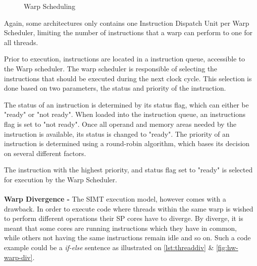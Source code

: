 \begin{figure}[ht]
	\centering
	\caption{Warp Scheduling}
	\label{fig:hw-warp-scheduling}
\end{figure}

Again, some architectures only contains one Instruction Dispatch Unit per Warp Scheduler, limiting the number of instructions that a warp can perform to one for all threads.

Prior to execution, instructions are located in a instruction queue, accessible to the Warp scheduler.
The warp scheduler is responsible of selecting the instructions that should be executed during the next clock cycle.
This selection is done based on two parameters, the status and priority of the instruction.

The status of an instruction is determined by its status flag, which can either be "ready" or "not ready".
When loaded into the instruction queue, an instructions flag is set to "not ready".
Once all operand and memory areas needed by the instruction is available, its status is changed to "ready".
The priority of an instruction is determined using a round-robin algorithm, which bases its decision on several different factors.

The instruction with the highest priority, and status flag set to "ready" is selected for execution by the Warp Scheduler.
\\\\
\textbf{Warp Divergence -} The SIMT execution model, however comes with a drawback.
In order to execute code where threads within the same warp is wished to perform different operations their SP cores have to diverge.
By diverge, it is meant that some cores are running instructions which they have in common, while others not having the same instructions remain idle and so on.
Such a code example could be a \textit{if-else} sentence as illustrated on
\autoref{lst:threaddiv} \& \cref{fig:hw-warp-div}.

